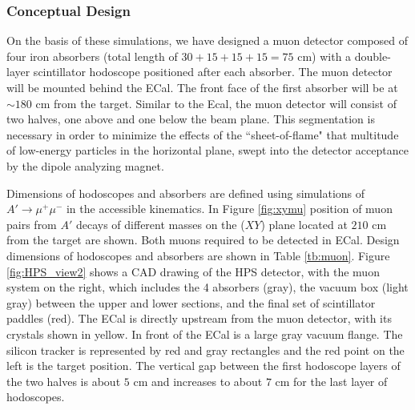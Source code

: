 \subsubsection{Conceptual Design}

On the basis of these simulations, we have designed a muon detector composed of four iron absorbers (total length of $30+15+15+15=75$ cm) with a double-layer scintillator hodoscope positioned after each absorber. The muon detector will be mounted behind the ECal.  The front face of the first absorber will be at $\sim 180$ cm from the target. Similar to the Ecal, the muon detector will consist of two halves, one above and one below the beam plane.  This segmentation is necessary in order to
minimize the effects of the ``sheet-of-flame" that multitude of low-energy particles in the horizontal plane, swept into the detector acceptance by the dipole analyzing magnet.

Dimensions of hodoscopes and absorbers are defined using simulations of $A'\to \mu^+\mu^-$ in the accessible kinematics. In Figure \ref{fig:xymu} position of muon pairs from $A'$ decays of different masses on the ($XY$) plane located at $210$ cm from the target are shown. Both muons required to be detected in ECal. Design dimensions of hodoscopes and absorbers are shown in Table \ref{tb:muon}.  Figure \ref{fig:HPS_view2} shows a CAD
drawing of the HPS detector, with the muon system on the right, which includes the 4 absorbers (gray), the vacuum box (light gray) between the upper and lower sections, and the final set of scintillator paddles (red). The ECal is directly upstream from the muon detector, with its crystals shown in yellow.  In front of the ECal is a large gray vacuum flange.  The silicon tracker is represented by red and gray rectangles and  the red point on the left is the target position. The vertical gap between the first hodoscope layers of the two halves is about $5$ cm and increases to about $7$ cm for the last layer of hodoscopes. 

